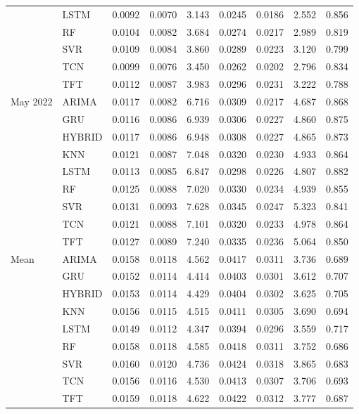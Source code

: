 \begin{tabular}{lllllllll}
 & LSTM & 0.0092 & 0.0070 & 3.143 & 0.0245 & 0.0186 & 2.552 & 0.856 \\
 & RF & 0.0104 & 0.0082 & 3.684 & 0.0274 & 0.0217 & 2.989 & 0.819 \\
 & SVR & 0.0109 & 0.0084 & 3.860 & 0.0289 & 0.0223 & 3.120 & 0.799 \\
 & TCN & 0.0099 & 0.0076 & 3.450 & 0.0262 & 0.0202 & 2.796 & 0.834 \\
 & TFT & 0.0112 & 0.0087 & 3.983 & 0.0296 & 0.0231 & 3.222 & 0.788 \\
May 2022 & ARIMA & 0.0117 & 0.0082 & 6.716 & 0.0309 & 0.0217 & 4.687 & 0.868 \\
 & GRU & 0.0116 & 0.0086 & 6.939 & 0.0306 & 0.0227 & 4.860 & 0.875 \\
 & HYBRID & 0.0117 & 0.0086 & 6.948 & 0.0308 & 0.0227 & 4.865 & 0.873 \\
 & KNN & 0.0121 & 0.0087 & 7.048 & 0.0320 & 0.0230 & 4.933 & 0.864 \\
 & LSTM & 0.0113 & 0.0085 & 6.847 & 0.0298 & 0.0226 & 4.807 & 0.882 \\
 & RF & 0.0125 & 0.0088 & 7.020 & 0.0330 & 0.0234 & 4.939 & 0.855 \\
 & SVR & 0.0131 & 0.0093 & 7.628 & 0.0345 & 0.0247 & 5.323 & 0.841 \\
 & TCN & 0.0121 & 0.0088 & 7.101 & 0.0320 & 0.0233 & 4.978 & 0.864 \\
 & TFT & 0.0127 & 0.0089 & 7.240 & 0.0335 & 0.0236 & 5.064 & 0.850 \\
Mean & ARIMA & 0.0158 & 0.0118 & 4.562 & 0.0417 & 0.0311 & 3.736 & 0.689 \\
 & GRU & 0.0152 & 0.0114 & 4.414 & 0.0403 & 0.0301 & 3.612 & 0.707 \\
 & HYBRID & 0.0153 & 0.0114 & 4.429 & 0.0404 & 0.0302 & 3.625 & 0.705 \\
 & KNN & 0.0156 & 0.0115 & 4.515 & 0.0411 & 0.0305 & 3.690 & 0.694 \\
 & LSTM & 0.0149 & 0.0112 & 4.347 & 0.0394 & 0.0296 & 3.559 & 0.717 \\
 & RF & 0.0158 & 0.0118 & 4.585 & 0.0418 & 0.0311 & 3.752 & 0.686 \\
 & SVR & 0.0160 & 0.0120 & 4.736 & 0.0424 & 0.0318 & 3.865 & 0.683 \\
 & TCN & 0.0156 & 0.0116 & 4.530 & 0.0413 & 0.0307 & 3.706 & 0.693 \\
 & TFT & 0.0159 & 0.0118 & 4.622 & 0.0422 & 0.0312 & 3.777 & 0.687 \\
\bottomrule
\end{tabular}
